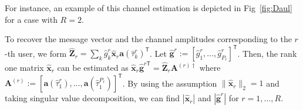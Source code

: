 \documentclass[conference,10pt]{IEEEtran}
\theoremstyle{remark}
\theoremstyle{plain}
\theoremstyle{definition}
\theoremstyle{remark}
\begin{document}
 For instance, an example of this channel estimation is depicted in Fig~\ref{fig:Daul} for a case with $R=2$. 
 
 To recover the message vector and the channel amplitudes corresponding to the $r$-th user, we form  $\widehat{\bm{Z}}_r=\sum_{k}\widehat{g}_k^r \widehat{\bm{x}}_r\bm{a}(\widehat{\tau}_k^r)^{\mathsf{T}}$. Let $\widehat{\bm{g}}^r:=[\widehat{g}_1^r, \ldots,\widehat{g}_{P_r}^r]^{\mathsf{T}}$. Then, the rank one matrix $\widehat{\bm{x}}_r$ can be estimated as $\widehat{\bm{x}}_r\widehat{\bm{g}}^{r\mathsf{T}}=\widehat{\bm{Z}}_r\bm{A}^{(r)\dagger}$ where $\bm{A}^{(r)}:=[\bm{a}(\widehat{\tau}_1^r), \ldots,\bm{a}(\widehat{\tau}_1^{P_r})]^\mathsf{T}$. By using the assumption $\|\widehat{\bm{x}}_r\|_2=1$ and taking singular value decomposition, we can find $|\widehat{\bm{x}}_r|$ and $|\widehat{\bm{g}}^r|$ for $r=1, \ldots, R$.
 
 
\end{document}

